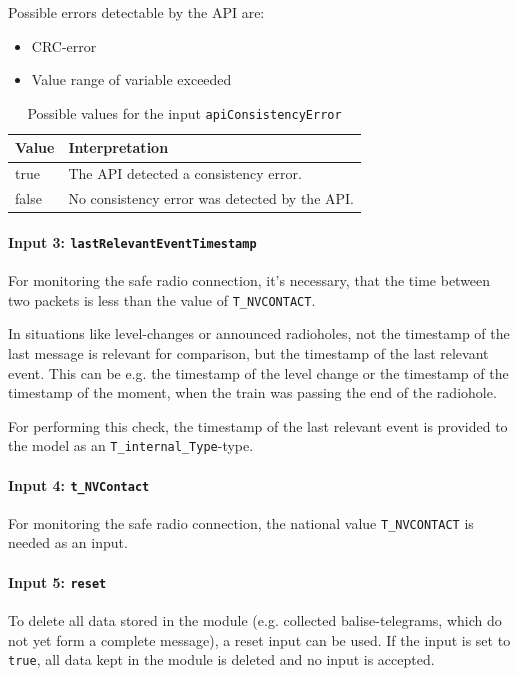 \documentclass{template/openetcs_report}
\begin{document}
Possible errors detectable by the API are:
\begin{itemize}
 \item CRC-error
 \item Value range of variable exceeded
\end{itemize}


\begin{table}[H]
  \begin{tabular}{| l | p{9cm} |}
    \hline
    \textbf{Value} & \textbf{Interpretation}\\ \hline
    true & The API detected a consistency error.\\
    false & No consistency error was detected by the API.\\
    \hline
  \end{tabular} 
  \caption{Possible values for the input \texttt{apiConsistencyError}}
  \label{tbl:apiConsistencyError}
\end{table}

\paragraph{Input 3: \texttt{lastRelevantEventTimestamp}}

For monitoring the safe radio connection, it's necessary, that the time between two packets is less than the value of \texttt{T\_NVCONTACT}.

In situations like level-changes or announced radioholes, not the timestamp of the last message is relevant for comparison, but the timestamp of the last relevant event. This can be e.g. the timestamp of the level change or the timestamp of the timestamp of the moment, when the train was passing the end of the radiohole. 

For performing this check, the timestamp of the last relevant event is provided to the model as an \texttt{T\_internal\_Type}-type.

\paragraph{Input 4: \texttt{t\_NVContact}}

For monitoring the safe radio connection, the national value \texttt{T\_NVCONTACT} is needed as an input.

\paragraph{Input 5: \texttt{reset}}
To delete all data stored in the module (e.g. collected balise-telegrams, which do not yet form a complete message), a reset input can be used. If the input is set to \texttt{true}, all data kept in the module is deleted and no input is accepted.
\end{document}
